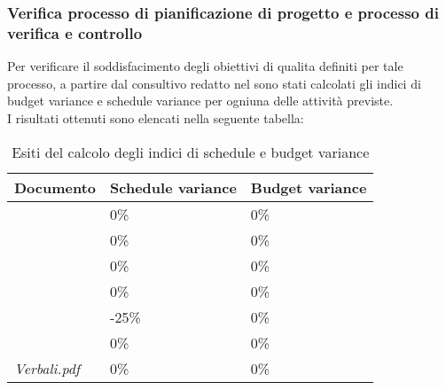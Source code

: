 		\subsubsection{Verifica processo di pianificazione di progetto e processo di verifica e controllo}
		Per verificare il soddisfacimento degli obiettivi di qualita definiti per tale processo, a partire dal 				consultivo redatto nel \PdP sono stati calcolati gli indici di budget variance e schedule variance per 				ogniuna delle attività previste.
		\\I risultati ottenuti sono elencati nella seguente tabella:	
		\begin{table}[H]
		\begin{tabular}{|l|l|l|}
		\hline
		\textbf{Documento} 		&\textbf{Schedule variance} &\textbf{Budget variance} \\
		\hline
		\PdQ 					&0\%		&0\%\\
		\NdP 					&0\%		&0\%\\
		\SdF 					&0\%		&0\%\\
		\AdR 					&0\%		&0\%\\
		\PdP 					&-25\%		&0\%\\
		\Glossario 				&0\%		&0\%\\
		\textit{Verbali.pdf} 	&0\%		&0\%\\
		\hline
		\end{tabular}
		\caption{Esiti del calcolo degli indici di schedule e budget variance}
		\end{table}
	

